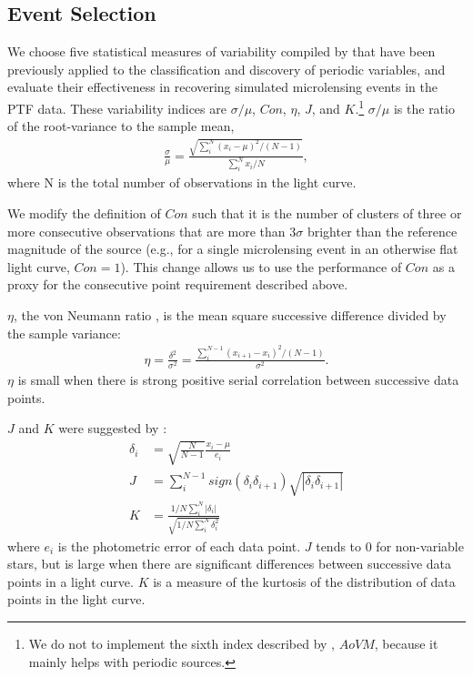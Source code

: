 \documentclass{emulateapj}
\begin{document}
\subsection{Event Selection} \label{sec:event_selection}
We choose five statistical measures of variability compiled by \cite{shin2009} that have been previously applied to the classification and discovery of periodic variables, and evaluate their effectiveness in recovering simulated microlensing events in the PTF data. These variability indices are $\sigma/\mu$, $Con$, $\eta$, $J$, and $K$.\footnote{We do not to implement the sixth index described by \cite{shin2009}, $AoVM$, because it mainly helps with periodic sources.} $\sigma/\mu$ is the ratio of the root-variance to the sample mean, 
\begin{align}
	\frac{\sigma}{\mu} = \frac{\sqrt{\sum^N_i (x_i - \mu)^2 / (N-1)}}{\sum^N_i x_i/N},
\end{align}
where N is the total number of observations in the light curve. 

We modify the definition of $Con$ such that it is the number of clusters of three or more consecutive observations that are more than $3\sigma$ brighter than the reference magnitude of the source (e.g., for a single microlensing event in an otherwise flat light curve, $Con=1$). This change allows us to use the performance of $Con$ as a proxy for the consecutive point requirement described above. 

$\eta$, the von Neumann ratio \citep{von_neumann1941}, is the mean square successive difference divided by the sample variance:
\begin{align}
	\eta = \frac{\delta^2}{\sigma^2} = \frac{\sum^{N-1}_i(x_{i+1} - x_i)^2/(N-1)}{\sigma^2}.
\end{align}
$\eta$ is small when there is strong positive serial correlation between successive data points. 

$J$ and $K$ were suggested by \cite{stetson1996}:
\begin{align}
	\delta_i &= \sqrt{\frac{N}{N-1}}\frac{x_i-\mu}{e_i}\\
	J &= \sum^{N-1}_i sign(\delta_i \delta_{i+1})\sqrt{|\delta_i \delta_{i+1}|}\\
	K &= \frac{1/N\sum^N_i |\delta_i|}{\sqrt{1/N\sum^N_i\delta_i^2}}
\end{align}
where $e_i$ is the photometric error of each data point. $J$ tends to 0 for non-variable stars, but is large when there are significant differences between successive data points in a light curve. $K$ is a measure of the kurtosis of the distribution of data points in the light curve.
\end{document}

